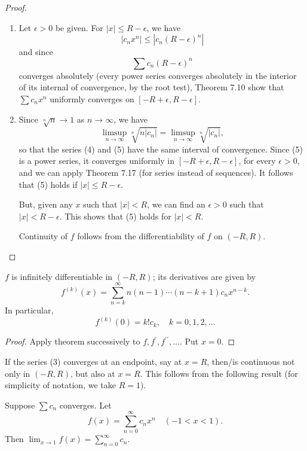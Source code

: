 \begin{proof} \
\begin{enumerate}[label=(\roman*)]
\item Let $\epsilon>0$ be given. For $|x|\le R-\epsilon$, we have
\[|c_nx^n|\le|c_n(R-\epsilon)^n|\]
and since
\[\sum c_n(R-\epsilon)^n\]
converges absolutely (every power series converges absolutely in the interior of its internal of convergence, by the root test), Theorem 7.10 show that $\sum c_nx^n$ uniformly converges on $[-R+\epsilon,R-\epsilon]$.

\item Since $\sqrt[n]{n}\to1$ as $n\to\infty$, we have
\[\limsup_{n\to\infty}\sqrt[n]{n|c_n|}=\limsup_{n\to\infty}\sqrt[n]{|c_n|},\]
so that the series (4) and (5) have the same interval of convergence. Since (5) is a power series, it converges uniformly in $[-R+\epsilon,R-\epsilon]$, for every $\epsilon>0$, and we can apply Theorem 7.17 (for series instead of sequences). It follows that (5) holds if $|x|\le R-\epsilon$.

But, given any $x$ such that $|x|<R$, we can find an $\epsilon>0$ such that $|x|<R-\epsilon$. This shows that (5) holds for $|x|<R$.

Continuity of $f$ follows from the differentiability of $f$ on $(-R,R)$.
\end{enumerate}
\end{proof}

\begin{corollary}
$f$ is infinitely differentiable in $(-R,R)$; its derivatives are given by
\[f^{(k)}(x)=\sum_{n=k}^\infty n(n-1)\cdots(n-k+1)c_nx^{n-k}.\]
In particular,
\[f^{(k)}(0)=k!c_k,\quad k=0,1,2,\dots\]
\end{corollary}

\begin{proof}
Apply theorem successively to $f,f^\prime,f^{\prime\prime},\dots$. Put $x=0$.
\end{proof}

If the series (3) converges at an endpoint, say at $x=R$, then/is continuous not only in $(-R,R)$, but also at $x=R$. This follows from the following result (for simplicity of notation, we take $R=1$).

\begin{proposition}
Suppose $\sum c_n$ converges. Let
\[f(x)=\sum_{n=0}^\infty c_n x^n\quad(-1<x<1).\]
Then $\displaystyle\lim_{x\to 1}f(x)=\sum_{n=0}^{\infty}c_n$.
\end{proposition}

